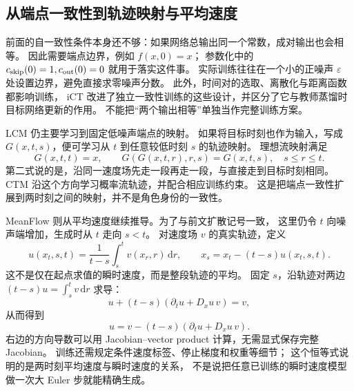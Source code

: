 \subsection{从端点一致性到轨迹映射与平均速度}
前面的自一致性条件本身还不够：如果网络总输出同一个常数，成对输出也会相等。
因此需要端点边界，例如 $f(x,0)=x$；
参数化中的 $c_{\rm skip}(0)=1,c_{\rm out}(0)=0$ 就用于落实这件事。
实际训练往往在一个小的正噪声 $\varepsilon$ 处设置边界，避免直接求零噪声分数。
此外，时间对的选取、离散化与距离函数都影响训练，
iCT 改进了独立一致性训练的这些设计，并区分了它与教师蒸馏时目标网络更新的作用。
不能把“两个输出相等”单独当作完整训练方案。\cite{cm,ict}

LCM 仍主要学习到固定低噪声端点的映射。
如果将目标时刻也作为输入，写成 $G(x,t,s)$，便可学习从 $t$ 到任意较低时刻 $s$ 的轨迹映射。
理想流映射满足
\[
G(x,t,t)=x,\qquad
G(G(x,t,r),r,s)=G(x,t,s),\quad s\leq r\leq t.
\]
第二式说的是，沿同一速度场先走一段再走一段，与直接走到目标时刻相同。
CTM 沿这个方向学习概率流轨迹，并配合相应训练约束。
这是把端点一致性扩展到两时刻之间的映射，并不是角色身份的一致性。\cite{ctm}

MeanFlow 则从平均速度继续推导。为了与前文扩散记号一致，
这里仍令 $t$ 向噪声端增加，生成时从 $t$ 走向 $s<t$。
对速度场 $v$ 的真实轨迹，定义
\[
u(x_t,s,t)=\frac1{t-s}\int_s^t v(x_r,r)\,\mathrm dr,
\qquad x_s=x_t-(t-s)u(x_t,s,t).
\]
这不是仅在起点求值的瞬时速度，而是整段轨迹的平均。
固定 $s$，沿轨迹对两边 $(t-s)u=\int_s^t v\,\mathrm dr$ 求导：
\[
u+(t-s)(\partial_tu+D_xu\,v)=v,
\]
从而得到
\[
u=v-(t-s)(\partial_tu+D_xu\,v).
\]
右边的方向导数可以用 Jacobian--vector product 计算，无需显式保存完整 Jacobian。
训练还需规定条件速度标签、停止梯度和权重等细节；
这个恒等式说明的是两时刻平均速度与瞬时速度的关系，
不是说把任意已训练的瞬时速度模型做一次大 Euler 步就能精确生成。\cite{meanflow,theorybook}
